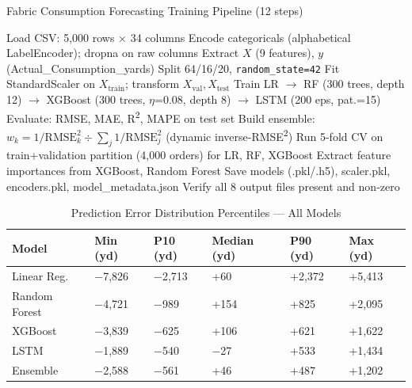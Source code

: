 \startappendices

\begin{algorithm}[htbp]
\caption{Fabric Consumption Forecasting Training Pipeline (12 steps)}
\begin{algorithmic}[1]
\State Load CSV: 5{,}000 rows $\times$ 34 columns
\State Encode categoricals (alphabetical LabelEncoder); dropna on raw columns
\State Extract $X$ (9 features), $y$ (Actual\_Consumption\_yards)
\State Split 64/16/20, \texttt{random\_state=42}
\State Fit StandardScaler on $X_{\text{train}}$; transform $X_{\text{val}}, X_{\text{test}}$
\State Train LR $\to$ RF (300 trees, depth 12) $\to$ XGBoost (300 trees, $\eta$=0.08, depth 8) $\to$ LSTM (200 eps, pat.=15)
\State Evaluate: RMSE, MAE, R\textsuperscript{2}, MAPE on test set
\State Build ensemble: $w_k = 1/\text{RMSE}_k^2 \div \sum_j 1/\text{RMSE}_j^2$ (dynamic inverse-RMSE\textsuperscript{2})
\State Run 5-fold CV on train+validation partition (4{,}000 orders) for LR, RF, XGBoost
\State Extract feature importances from XGBoost, Random Forest
\State Save models (.pkl/.h5), scaler.pkl, encoders.pkl, model\_metadata.json
\State Verify all 8 output files present and non-zero
\end{algorithmic}
\end{algorithm}

\begin{table}[htbp]
\centering\caption{Prediction Error Distribution Percentiles --- All Models}\label{tab:err}
\begin{tabularx}{\textwidth}{@{}Z Y Y Y Y Y@{}}
  \toprule
  \textbf{Model}&\textbf{Min (yd)}&\textbf{P10 (yd)}&\textbf{Median (yd)}&\textbf{P90 (yd)}&\textbf{Max (yd)}\\
  \midrule
  Linear Reg.&$-$7{,}826&$-$2{,}713&+60&+2{,}372&+5{,}413\\
  Random Forest&$-$4{,}721&$-$989&+154&+825&+2{,}095\\
  XGBoost&$-$3{,}839&$-$625&+106&+621&+1{,}622\\
  LSTM&$-$1{,}889&$-$540&$-$27&+533&+1{,}434\\
  Ensemble&$-$2{,}588&$-$561&+46&+487&+1{,}202\\
  \bottomrule
\end{tabularx}
\end{table}

